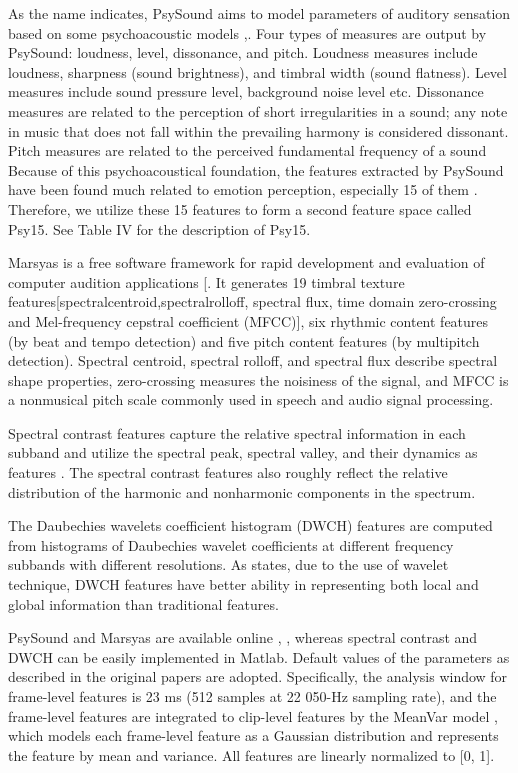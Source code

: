 \documentclass[journal, twoside]{IEEEtran}
\begin{document}
As the name indicates, PsySound aims to model parameters of auditory sensation based on some psychoacoustic models \cite{27},\cite{28}. Four types of measures are output by PsySound: loudness, level, dissonance, and pitch. Loudness measures include loudness, sharpness (sound brightness), and timbral width (sound flatness). Level measures include sound pressure level, background noise level etc. Dissonance measures are related to the perception of short irregularities in a sound; any note in music that does not fall within the prevailing harmony is considered dissonant. Pitch measures are related to the perceived fundamental frequency of a sound  Because of this psychoacoustical foundation, the features extracted by PsySound have been found much related to emotion perception, especially 15 of them \cite{8}. Therefore, we utilize these 15 features to form a second feature space called Psy15. See Table IV for the description of Psy15.

Marsyas is a free software framework for rapid development and evaluation of computer audition applications [\cite{29}. It generates 19 timbral texture features[spectralcentroid,spectralrolloff, spectral flux, time domain zero-crossing and Mel-frequency cepstral coefficient (MFCC)], six rhythmic content features (by beat and tempo detection) and five pitch content features (by multipitch detection). Spectral centroid, spectral rolloff, and spectral flux describe spectral shape properties, zero-crossing measures the noisiness of the signal, and MFCC is a nonmusical pitch scale commonly used in speech and audio signal processing.

Spectral contrast features capture the relative spectral information in each subband and utilize the spectral peak, spectral valley, and their dynamics as features \cite{3}. The spectral contrast features also roughly reflect the relative distribution of the harmonic and nonharmonic components in the spectrum.

The Daubechies wavelets coefficient histogram (DWCH) features are computed from histograms of Daubechies wavelet coefficients at different frequency subbands with different resolutions. As \cite{2} states, due to the use of wavelet technique, DWCH features have better ability in representing both local and global information than traditional features.

PsySound and Marsyas are available online \cite{27}, \cite{29}, whereas spectral contrast and DWCH can be easily implemented in Matlab. Default values of the parameters as described in the original papers are adopted. Specifically, the analysis window for frame-level features is 23 ms (512 samples at 22 050-Hz sampling rate), and the frame-level features are
integrated to clip-level features by the MeanVar model \cite{30}, which models each frame-level feature as a Gaussian distribution and represents the feature by mean and variance. All features are linearly normalized to [0, 1].
\end{document}
